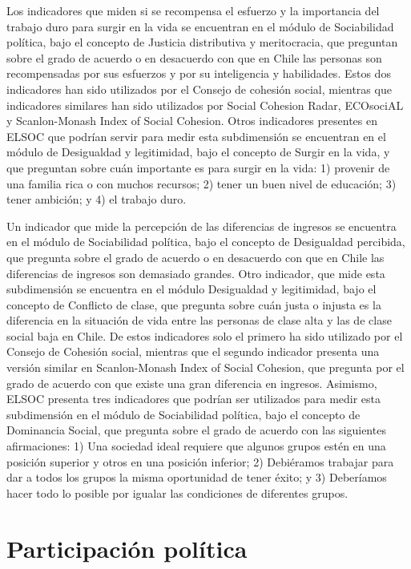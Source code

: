\documentclass[
  12pt,
]{book}
\begin{document}
Los indicadores que miden si se recompensa el esfuerzo y la importancia del trabajo duro para surgir en la vida se encuentran en el módulo de Sociabilidad política, bajo el concepto de Justicia distributiva y meritocracia, que preguntan sobre el grado de acuerdo o en desacuerdo con que en Chile las personas son recompensadas por sus esfuerzos y por su inteligencia y habilidades. Estos dos indicadores han sido utilizados por el Consejo de cohesión social, mientras que indicadores similares han sido utilizados por Social Cohesion Radar, ECOsociAL y Scanlon-Monash Index of Social Cohesion. Otros indicadores presentes en ELSOC que podrían servir para medir esta subdimensión se encuentran en el módulo de Desigualdad y legitimidad, bajo el concepto de Surgir en la vida, y que preguntan sobre cuán importante es para surgir en la vida: 1) provenir de una familia rica o con muchos recursos; 2) tener un buen nivel de educación; 3) tener ambición; y 4) el trabajo duro.

Un indicador que mide la percepción de las diferencias de ingresos se encuentra en el módulo de Sociabilidad política, bajo el concepto de Desigualdad percibida, que pregunta sobre el grado de acuerdo o en desacuerdo con que en Chile las diferencias de ingresos son demasiado grandes. Otro indicador, que mide esta subdimensión se encuentra en el módulo Desigualdad y legitimidad, bajo el concepto de Conflicto de clase, que pregunta sobre cuán justa o injusta es la diferencia en la situación de vida entre las personas de clase alta y las de clase social baja en Chile. De estos indicadores solo el primero ha sido utilizado por el Consejo de Cohesión social, mientras que el segundo indicador presenta una versión similar en Scanlon-Monash Index of Social Cohesion, que pregunta por el grado de acuerdo con que existe una gran diferencia en ingresos. Asimismo, ELSOC presenta tres indicadores que podrían ser utilizados para medir esta subdimensión en el módulo de Sociabilidad política, bajo el concepto de Dominancia Social, que pregunta sobre el grado de acuerdo con las siguientes afirmaciones: 1) Una sociedad ideal requiere que algunos grupos estén en una posición superior y otros en una posición inferior; 2) Debiéramos trabajar para dar a todos los grupos la misma oportunidad de tener éxito; y 3) Deberíamos hacer todo lo posible por igualar las condiciones de diferentes grupos.

\hypertarget{participaciuxf3n-poluxedtica-1}{%
\section{Participación política}\label{participaciuxf3n-poluxedtica-1}}
\end{document}

